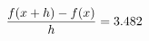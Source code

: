 \documentclass[preview]{standalone}
\begin{document}
\begin{align*}
\special{dvisvgm:raw <g id='unique000'>}\frac{f(x+h)-f(x)}{h} = 3.482\special{dvisvgm:raw </g>}
\end{align*}
\end{document}
